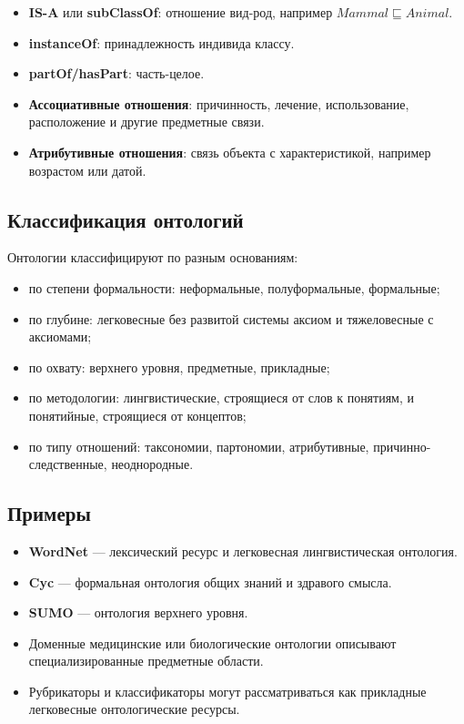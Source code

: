 \begin{itemize}
    \item \textbf{IS-A} или \textbf{subClassOf}: отношение вид-род, например $Mammal\sqsubseteq Animal$.
    \item \textbf{instanceOf}: принадлежность индивида классу.
    \item \textbf{partOf/hasPart}: часть-целое.
    \item \textbf{Ассоциативные отношения}: причинность, лечение, использование, расположение и другие предметные связи.
    \item \textbf{Атрибутивные отношения}: связь объекта с характеристикой, например возрастом или датой.
\end{itemize}

\subsection*{Классификация онтологий}

Онтологии классифицируют по разным основаниям:
\begin{itemize}
    \item по степени формальности: неформальные, полуформальные, формальные;
    \item по глубине: легковесные без развитой системы аксиом и тяжеловесные с аксиомами;
    \item по охвату: верхнего уровня, предметные, прикладные;
    \item по методологии: лингвистические, строящиеся от слов к понятиям, и понятийные, строящиеся от концептов;
    \item по типу отношений: таксономии, партономии, атрибутивные, причинно-следственные, неоднородные.
\end{itemize}

\subsection*{Примеры}

\begin{itemize}
    \item \textbf{WordNet} --- лексический ресурс и легковесная лингвистическая онтология.
    \item \textbf{Cyc} --- формальная онтология общих знаний и здравого смысла.
    \item \textbf{SUMO} --- онтология верхнего уровня.
    \item Доменные медицинские или биологические онтологии описывают специализированные предметные области.
    \item Рубрикаторы и классификаторы могут рассматриваться как прикладные легковесные онтологические ресурсы.
\end{itemize}

